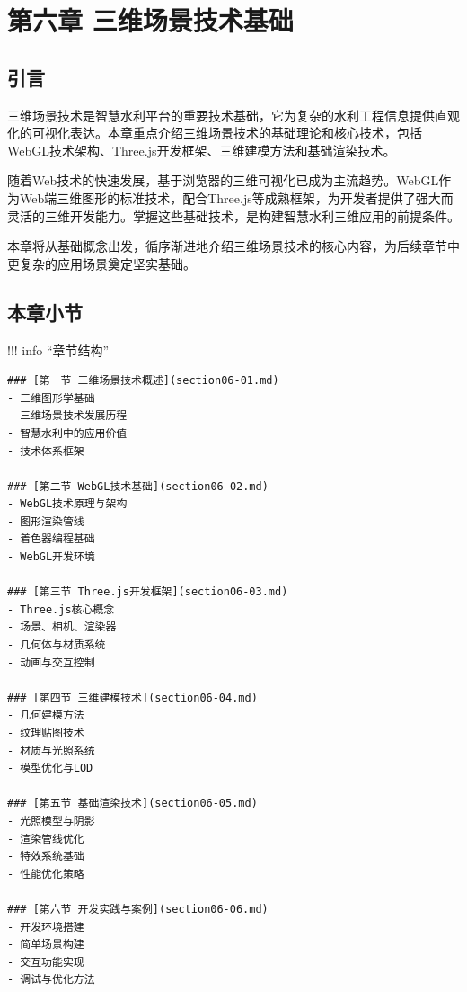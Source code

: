 \hypertarget{ux7b2cux516dux7ae0-ux4e09ux7ef4ux573aux666fux6280ux672fux57faux7840}{%
\section{第六章 三维场景技术基础}\label{ux7b2cux516dux7ae0-ux4e09ux7ef4ux573aux666fux6280ux672fux57faux7840}}


\hypertarget{ux5f15ux8a00}{%
\subsection{引言}\label{ux5f15ux8a00}}

三维场景技术是智慧水利平台的重要技术基础，它为复杂的水利工程信息提供直观化的可视化表达。本章重点介绍三维场景技术的基础理论和核心技术，包括WebGL技术架构、Three.js开发框架、三维建模方法和基础渲染技术。

随着Web技术的快速发展，基于浏览器的三维可视化已成为主流趋势。WebGL作为Web端三维图形的标准技术，配合Three.js等成熟框架，为开发者提供了强大而灵活的三维开发能力。掌握这些基础技术，是构建智慧水利三维应用的前提条件。

本章将从基础概念出发，循序渐进地介绍三维场景技术的核心内容，为后续章节中更复杂的应用场景奠定坚实基础。

\hypertarget{ux672cux7ae0ux5c0fux8282}{%
\subsection{本章小节}\label{ux672cux7ae0ux5c0fux8282}}

!!! info ``章节结构''

\begin{verbatim}
### [第一节 三维场景技术概述](section06-01.md)
- 三维图形学基础
- 三维场景技术发展历程
- 智慧水利中的应用价值
- 技术体系框架

### [第二节 WebGL技术基础](section06-02.md) 
- WebGL技术原理与架构
- 图形渲染管线
- 着色器编程基础
- WebGL开发环境

### [第三节 Three.js开发框架](section06-03.md)
- Three.js核心概念
- 场景、相机、渲染器
- 几何体与材质系统
- 动画与交互控制

### [第四节 三维建模技术](section06-04.md)
- 几何建模方法
- 纹理贴图技术
- 材质与光照系统
- 模型优化与LOD

### [第五节 基础渲染技术](section06-05.md)
- 光照模型与阴影
- 渲染管线优化
- 特效系统基础
- 性能优化策略

### [第六节 开发实践与案例](section06-06.md)
- 开发环境搭建
- 简单场景构建
- 交互功能实现
- 调试与优化方法
\end{verbatim}

